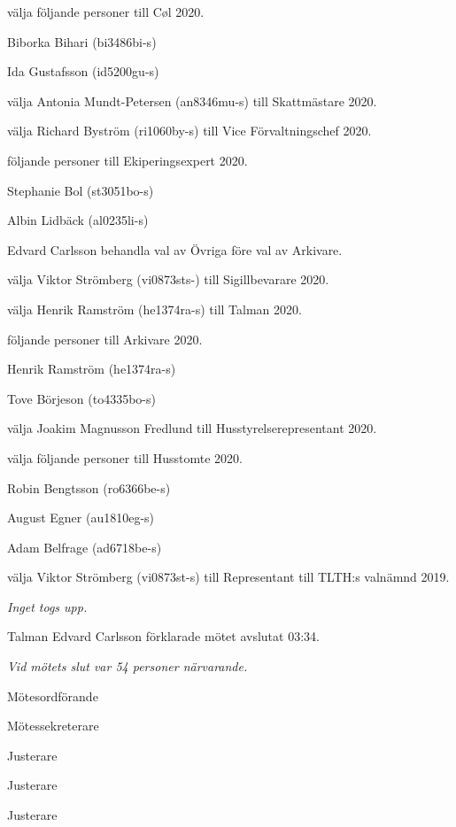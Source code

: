 \documentclass[10pt]{article}
\def\mo{Edvard Carlsson}
\def\ms{Mattias Lundström}
\def\ji{Malin Svärdling}
\def\jii{Henrik Ramström}
\def\jiii{Theo Nyman}
\begin{document}
\begin{paragrafer}
\begin{paralist}
    \Mba välja följande personer till Cøl 2020.
    \begin{tightdashlist}
        \item Biborka Bihari (bi3486bi-s)
        \item Ida Gustafsson (id5200gu-s)
    \end{tightdashlist}

    \Mba välja Antonia Mundt-Petersen (an8346mu-s) till Skattmästare 2020.

    \Mba välja Richard Byström (ri1060by-s) till Vice Förvaltningschef 2020.

    \newpage

    \Mba följande personer till Ekiperingsexpert 2020.
    \begin{tightdashlist}
        \item Stephanie Bol (st3051bo-s)
        \item Albin Lidbäck (al0235li-s)
    \end{tightdashlist}
    
    Edvard Carlsson \ypa behandla val av Övriga före val av Arkivare. 

    \textbf{\Mbaby}

    \Mba välja Viktor Strömberg (vi0873sts-) till Sigillbevarare 2020.

    \Mba välja Henrik Ramström (he1374ra-s) till Talman 2020. 

    \Mba följande personer till Arkivare 2020.
    \begin{tightdashlist}
        \item Henrik Ramström (he1374ra-s)
        \item Tove Börjeson (to4335bo-s)
    \end{tightdashlist}

    \Mba välja Joakim Magnusson Fredlund till Husstyrelserepresentant 2020.

    \Mba välja följande personer till Husstomte 2020.
    \begin{tightdashlist}
        \item Robin Bengtsson (ro6366be-s)
        \item August Egner (au1810eg-s)
        \item Adam Belfrage (ad6718be-s)
    \end{tightdashlist}
    

    \Mba välja Viktor Strömberg (vi0873st-s) till Representant till TLTH:s valnämnd 2019.

\end{paralist}

\emph{Inget togs upp.}

Talman {\mo} förklarade mötet avslutat 03:34.

\emph{Vid mötets slut var 54 personer närvarande.}

\end{paragrafer}

\newpage
\hidesignfoot
\begin{signatures}{5}
\signature{\mo}{Mötesordförande}
\signature{\ms}{Mötessekreterare}
\signature{\ji}{Justerare}
\signature{\jii}{Justerare}
\signature{\jiii}{Justerare}
\end{signatures}
\end{document}
